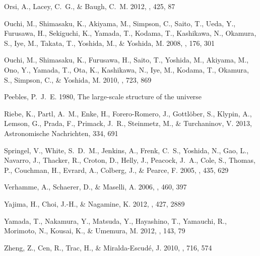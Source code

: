 \documentclass{emulateapj}
\begin{document}
\begin{thebibliography}{36}
{Orsi}, A., {Lacey}, C.~G., \& {Baugh}, C.~M. 2012, \mnras, 425, 87

{Ouchi}, M., {Shimasaku}, K., {Akiyama}, M., {Simpson}, C., {Saito}, T.,
  {Ueda}, Y., {Furusawa}, H., {Sekiguchi}, K., {Yamada}, T., {Kodama}, T.,
  {Kashikawa}, N., {Okamura}, S., {Iye}, M., {Takata}, T., {Yoshida}, M., \&
  {Yoshida}, M. 2008, \apjs, 176, 301

{Ouchi}, M., {Shimasaku}, K., {Furusawa}, H., {Saito}, T., {Yoshida}, M.,
  {Akiyama}, M., {Ono}, Y., {Yamada}, T., {Ota}, K., {Kashikawa}, N., {Iye},
  M., {Kodama}, T., {Okamura}, S., {Simpson}, C., \& {Yoshida}, M. 2010, \apj,
  723, 869

{Peebles}, P.~J.~E. 1980, {The large-scale structure of the universe}

Riebe, K., Partl, A.~M., Enke, H., Forero-Romero, J., Gottlöber, S., Klypin,
  A., Lemson, G., Prada, F., Primack, J.~R., Steinmetz, M., \& Turchaninov, V.
  2013, Astronomische Nachrichten, 334, 691

{Springel}, V., {White}, S.~D.~M., {Jenkins}, A., {Frenk}, C.~S., {Yoshida},
  N., {Gao}, L., {Navarro}, J., {Thacker}, R., {Croton}, D., {Helly}, J.,
  {Peacock}, J.~A., {Cole}, S., {Thomas}, P., {Couchman}, H., {Evrard}, A.,
  {Colberg}, J., \& {Pearce}, F. 2005, \nat, 435, 629

{Verhamme}, A., {Schaerer}, D., \& {Maselli}, A. 2006, \aap, 460, 397

{Yajima}, H., {Choi}, J.-H., \& {Nagamine}, K. 2012, \mnras, 427, 2889

{Yamada}, T., {Nakamura}, Y., {Matsuda}, Y., {Hayashino}, T., {Yamauchi}, R.,
  {Morimoto}, N., {Kousai}, K., \& {Umemura}, M. 2012, \aj, 143, 79

{Zheng}, Z., {Cen}, R., {Trac}, H., \& {Miralda-Escud{\'e}}, J. 2010, \apj,
  716, 574

\end{thebibliography}
\end{document}
